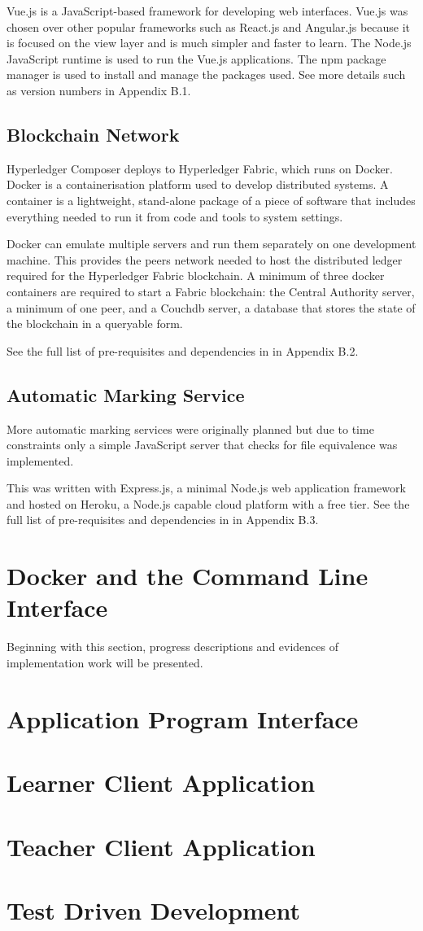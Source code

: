 Vue.js is a JavaScript-based framework for developing web interfaces. Vue.js was chosen over other 
popular frameworks such as React.js and Angular.js because it is focused on the view layer and is much 
simpler and faster to learn. The Node.js JavaScript runtime is used to run the Vue.js applications. The npm package manager 
is used to install and manage the packages used. See more details such as version numbers in Appendix B.1.

\subsection{Blockchain Network}

Hyperledger Composer deploys to Hyperledger Fabric, which runs on Docker.
Docker is a containerisation platform used to develop distributed systems. 
A container is a lightweight, stand-alone package of a piece of software that includes everything 
needed to run it from code and tools to system settings. 

Docker can emulate multiple servers and run them separately on one development machine. 
This provides the peers network needed to host the distributed ledger required for the 
Hyperledger Fabric blockchain. A minimum of three docker containers are required to start a 
Fabric blockchain: the Central Authority server, a minimum of one peer, and a Couchdb server, 
a database that stores the state of the blockchain in a queryable form.

See the full list of pre-requisites and dependencies in in Appendix B.2.

\subsection{Automatic Marking Service}

More automatic marking services were originally planned but due to time constraints only 
a simple JavaScript server that checks for file equivalence was implemented. 

This was written with Express.js, a minimal Node.js web application framework and hosted 
on Heroku, a Node.js capable cloud platform with a free tier. See the full list of pre-requisites and dependencies in in Appendix B.3.

\section{Docker and the Command Line Interface}

Beginning with this section, progress descriptions and evidences of implementation work will be presented.

\section{Application Program Interface}

\section{Learner Client Application}

\section{Teacher Client Application}

\section{Test Driven Development}